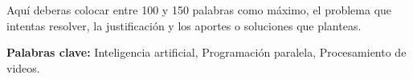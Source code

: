 \begin{resumen}

  \begin{figure}[!htb]
  \centering
  \label{fig:Attrib2}
  \end{figure}

Aquí deberas colocar entre 100 y 150 palabras como máximo, el problema que intentas resolver, la justificación y los aportes o soluciones que planteas.

\begin{flushleft}
\textbf{Palabras clave:} Inteligencia artificial, Programación paralela, Procesamiento de videos.
\end{flushleft}

\end{resumen}
